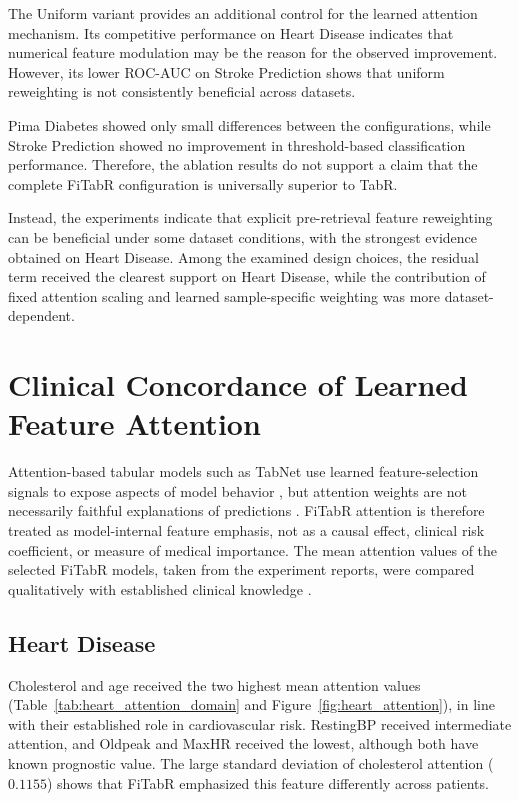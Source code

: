 \documentclass[11pt,a4paper,oneside, openany, reqno, chapter, nokorean]{oblivoir}
\theoremstyle{definition}
\theoremstyle{remark}
\numberwithin{equation}{chapter}
\theoremstyle{definition}
\theoremstyle{remark}
\theoremstyle{definition}
\begin{document}
The Uniform variant provides an additional control for the learned
attention mechanism. Its competitive performance on Heart Disease
indicates that numerical feature modulation may be the reason for 
the observed improvement. However, its lower ROC-AUC
on Stroke Prediction shows that uniform reweighting is not consistently
beneficial across datasets.

Pima Diabetes showed only small differences between the configurations,
while Stroke Prediction showed no improvement in threshold-based
classification performance. Therefore, the ablation results do not
support a claim that the complete FiTabR configuration is universally
superior to TabR.

Instead, the experiments indicate that explicit pre-retrieval feature
reweighting can be beneficial under some dataset conditions, with the
strongest evidence obtained on Heart Disease. Among the examined design
choices, the residual term received the clearest support on Heart Disease, 
while the contribution of fixed attention scaling and learned
sample-specific weighting was more dataset-dependent.

\FloatBarrier
\section{Clinical Concordance of Learned Feature Attention}
\label{sec:clinical_attention}

Attention-based tabular models such as TabNet use learned feature-selection
signals to expose aspects of model behavior \cite{arik2021tabnet}, but
attention weights are not necessarily faithful explanations of predictions
\cite{jain2019attention}. FiTabR attention is therefore treated as
model-internal feature emphasis, not as a causal effect, clinical risk
coefficient, or measure of medical importance. The mean attention values of
the selected FiTabR models, taken from the experiment reports, were compared
qualitatively with established clinical knowledge
\cite{visseren2021,dagostino2008,score2_2021,ctt2012,erfc2010,
ada2026diagnosis,bushnell2024}.

\subsection{Heart Disease}
\label{subsec:heart_attention}

Cholesterol and age received the two highest mean attention values
(Table~\ref{tab:heart_attention_domain} and
Figure~\ref{fig:heart_attention}), in line with their established role in
cardiovascular risk. RestingBP received intermediate attention,
and Oldpeak and MaxHR received the lowest, although both have
known prognostic value. The large standard deviation of cholesterol attention
($0.1155$) shows that FiTabR emphasized this feature differently across
patients.
\end{document}

